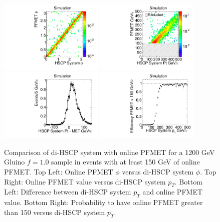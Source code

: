 \begin{figure}
  \begin{center}
      \includegraphics[clip=true, trim=0.0cm 0cm 3.0cm 0cm, width=0.44\textwidth]{figures/search/Gluino_8TeV_M1200_f100SystPhiMET}
      \includegraphics[clip=true, trim=0.0cm 0cm 3.0cm 0cm, width=0.44\textwidth]{figures/search/Gluino_8TeV_M1200_f100SystPtMET} \\
      \includegraphics[clip=true, trim=0.0cm 0cm 3.0cm 0cm, width=0.44\textwidth]{figures/search/Gluino_8TeV_M1200_f100SystPtDiffMET}
      \includegraphics[clip=true, trim=0.0cm 0cm 3.0cm 0cm, width=0.44\textwidth]{figures/search/Gluino_8TeV_M1200_f100SystPtEff}
      \renewcommand\baselinestretch{1}\caption[Gluino1200f100 System Pt vs MET]
        {Comparison of di-HSCP system with online PFMET for a 1200 GeV Gluino $f=1.0$ sample in events with at least 150 GeV of online PFMET. 
         Top Left: Online PFMET $\phi$ versus di-HSCP system $\phi.$ Top Right: Online PFMET value versus di-HSCP system $p_T$. 
         Bottom Left: Difference between di-HSCP system $p_T$ and online PFMET value.
         Bottom Right: Probability to have online PFMET greater than 150 versus di-HSCP system $p_T$.
        }
      \renewcommand\baselinestretch{\@spacing}
      \label{fig:SystPtTrigger}
  \end{center}
\end{figure}


